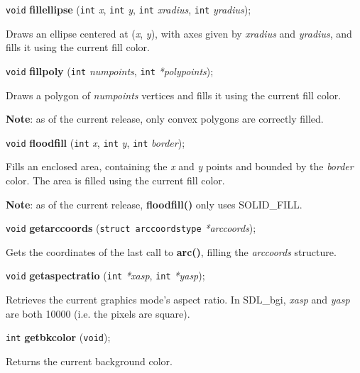 \documentclass[a4paper,11pt]{article}
\newcommand{\SDLbgi}{SDL\_bgi}
\newcommand{\V}{\texttt{void}}      %
\newcommand{\I}{\texttt{int}}       %
\newcommand{\func}[1]{\textbf{#1}}  %
\newcommand{\A}[1]{\emph{#1}}       %
\newenvironment{bgi}
{ %
  \begin{snugshade}
}
{ %
  \end{snugshade}
}
\begin{document}

\begin{bgi}
\V{} \func{fillellipse} (\I{} \A{x}, \I{} \A{y}, \I{} \A{xradius},
\I{} \A{yradius});
\end{bgi}

Draws an ellipse centered at (\A{x}, \A{y}), with axes given by
\A{xradius} and \A{yradius}, and fills it using the current fill
color.


\begin{bgi}
\V{} \func{fillpoly} (\I{} \A{numpoints}, \I{} \A{*polypoints});
\end{bgi}

Draws a polygon of \A{numpoints} vertices and fills it using the
current fill color.

\textbf{Note}: as of the current release, only convex polygons are
correctly filled.


\begin{bgi}
\V{} \func{floodfill} (\I{} \A{x}, \I{} \A{y}, \I{} \A{border});
\end{bgi}

Fills an enclosed area, containing the \A{x} and \A{y} points and
bounded by the \A{border} color. The area is filled using the
current fill color.

\textbf{Note}: as of the current release, \func{floodfill()} only uses
SOLID\_FILL.


\begin{bgi}
\V{} \func{getarccoords} (\texttt{struct arccoordstype} \A{*arccoords});
\end{bgi}

Gets the coordinates of the last call to \func{arc()}, filling the
\A{arccoords} structure.


\begin{bgi}
\V{} \func{getaspectratio} (\I{} \A{*xasp}, \I{} \A{*yasp});
\end{bgi}

Retrieves the current graphics mode's aspect ratio. In \SDLbgi,
\A{xasp} and \A{yasp} are both 10000 (i.e. the pixels are square).


\begin{bgi}
\I{} \func{getbkcolor} (\V{});
\end{bgi}

Returns the current background color.
\end{document}
